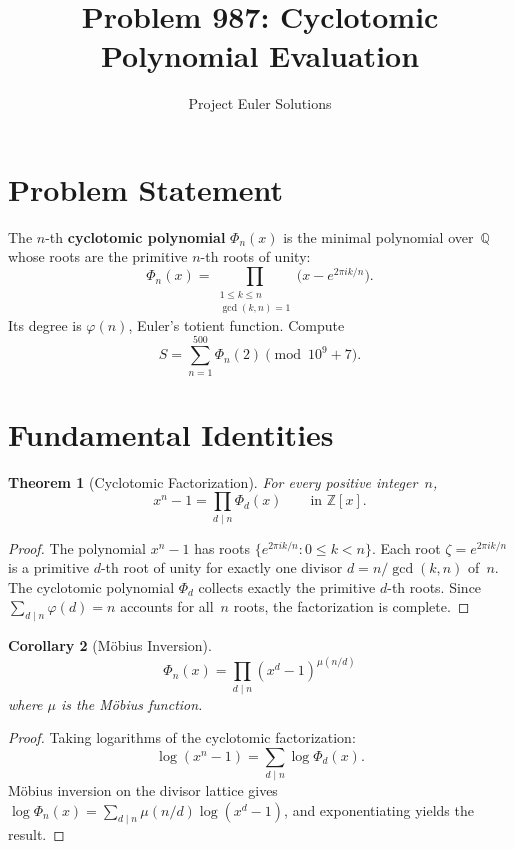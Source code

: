 \documentclass[11pt]{article}
\title{Problem 987: Cyclotomic Polynomial Evaluation}
\author{Project Euler Solutions}
\date{}
\newtheorem{theorem}{Theorem}
\newtheorem{corollary}[theorem]{Corollary}
\begin{document}
\maketitle

\section{Problem Statement}

The $n$-th \textbf{cyclotomic polynomial} $\Phi_n(x)$ is the minimal polynomial over~$\mathbb{Q}$ whose roots are the primitive $n$-th roots of unity:
\[
\Phi_n(x) = \prod_{\substack{1 \le k \le n \\ \gcd(k,n) = 1}} \!\bigl(x - e^{2\pi i k/n}\bigr).
\]
Its degree is $\varphi(n)$, Euler's totient function. Compute
\[
S = \sum_{n=1}^{500} \Phi_n(2) \pmod{10^9 + 7}.
\]

\section{Fundamental Identities}

\begin{theorem}[Cyclotomic Factorization]
For every positive integer~$n$,
\[
x^n - 1 = \prod_{d \mid n} \Phi_d(x) \qquad \text{in } \mathbb{Z}[x].
\]
\end{theorem}

\begin{proof}
The polynomial $x^n - 1$ has roots $\{e^{2\pi ik/n} : 0 \le k < n\}$. Each root $\zeta = e^{2\pi i k/n}$ is a primitive $d$-th root of unity for exactly one divisor $d = n/\gcd(k,n)$ of~$n$. The cyclotomic polynomial $\Phi_d$ collects exactly the primitive $d$-th roots. Since $\sum_{d \mid n} \varphi(d) = n$ accounts for all~$n$ roots, the factorization is complete.
\end{proof}

\begin{corollary}[M\"obius Inversion]
\label{cor:mobius}
\[
\Phi_n(x) = \prod_{d \mid n} (x^d - 1)^{\mu(n/d)}
\]
where $\mu$ is the M\"obius function.
\end{corollary}

\begin{proof}
Taking logarithms of the cyclotomic factorization:
\[
\log(x^n - 1) = \sum_{d \mid n} \log \Phi_d(x).
\]
M\"obius inversion on the divisor lattice gives $\log \Phi_n(x) = \sum_{d \mid n} \mu(n/d) \log(x^d - 1)$, and exponentiating yields the result.
\end{proof}
\end{document}
